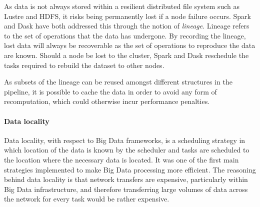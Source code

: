                     As data is not always stored within a resilient distributed
                    file system such as Lustre and HDFS, it risks being
                    permanently lost if a node failure occurs. Spark and Dask
                    have both addressed this through the notion of
                    \textit{lineage}. Lineage refers to the set of operations
                    that the data has undergone. By recording the lineage, lost
                    data will always be recoverable as the set of operations to
                    reproduce the data are known. Should a node be lost to the
                    cluster, Spark and Dask reschedule the tasks required to
                    rebuild the dataset to other nodes.

                    As subsets of the lineage can be reused amongst different
                    structures in the pipeline, it is possible to cache the data
                    in order to avoid any form of recomputation, which could
                    otherwise incur performance penalties.
                                      
 
                \paragraph{Data locality}
                    Data locality, with respect to Big Data frameworks, is a
                    scheduling strategy in which location of the data is known
                    by the scheduler and tasks are scheduled to the location
                    where the necessary data is located. It was one of the first
                    main strategies implemented to make Big Data processing more
                    efficient. The reasoning behind data locality is that
                    network transfers are expensive, particularly within Big
                    Data infrastructure, and therefore transferring large
                    volumes of data across the network for every task would be
                    rather expensive.

